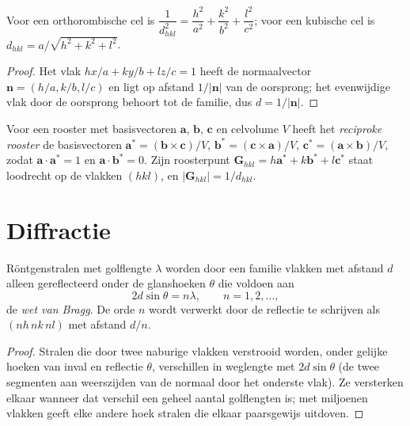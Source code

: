 \begin{proposition}\label{prop:b3:x-ray-diffraction:spacing}
Voor een orthorombische cel is $\dfrac{1}{d_{hkl}^2} = \dfrac{h^2}{a^2} + \dfrac{k^2}{b^2} +
\dfrac{l^2}{c^2}$; voor een kubische cel is $d_{hkl} = a/\sqrt{h^2 + k^2 + l^2}$.
\end{proposition}

\begin{proof}
Het vlak $hx/a + ky/b + lz/c = 1$ heeft de normaalvector $\mathbf n = (h/a, k/b, l/c)$
en ligt op afstand $1/|\mathbf n|$ van de oorsprong; het evenwijdige vlak
door de oorsprong behoort tot de familie, dus $d = 1/|\mathbf n|$.
\end{proof}

\begin{definition}\label{def:b3:x-ray-diffraction:reciprocal}
Voor een rooster met basisvectoren $\mathbf a$, $\mathbf b$, $\mathbf c$ en celvolume $V$
heeft het \emph{reciproke rooster} de basisvectoren
$\mathbf a^* = (\mathbf b\times\mathbf c)/V$, $\mathbf b^* = (\mathbf c\times\mathbf a)/V$,
$\mathbf c^* = (\mathbf a\times\mathbf b)/V$, zodat $\mathbf a\cdot\mathbf a^* = 1$ en
$\mathbf a\cdot\mathbf b^* = 0$. Zijn roosterpunt $\mathbf G_{hkl} = h\mathbf a^* + k\mathbf b^* + l\mathbf c^*$ staat
loodrecht op de vlakken $(hkl)$, en $|\mathbf G_{hkl}| = 1/d_{hkl}$.
\end{definition}

\section{Diffractie}

\begin{theorem}\label{thm:b3:x-ray-diffraction:bragg}
Röntgenstralen met golflengte $\lambda$ worden door een familie vlakken
met afstand $d$ alleen gereflecteerd onder de glanshoeken $\theta$ die
voldoen aan
\[
2d\sin\theta = n\lambda, \qquad n = 1, 2, \dots,
\]
de \emph{wet van Bragg}. De orde $n$ wordt verwerkt
door de reflectie te schrijven als $(nh\,nk\,nl)$ met afstand $d/n$.
\end{theorem}

\begin{proof}
Stralen die door twee naburige vlakken verstrooid worden, onder gelijke
hoeken van inval en reflectie $\theta$, verschillen in weglengte met $2d\sin\theta$ (de twee
segmenten aan weerszijden van de normaal door het onderste vlak). Ze
versterken elkaar wanneer dat verschil een geheel aantal golflengten is;
met miljoenen vlakken geeft elke andere hoek stralen die elkaar paarsgewijs
uitdoven.
\end{proof}

